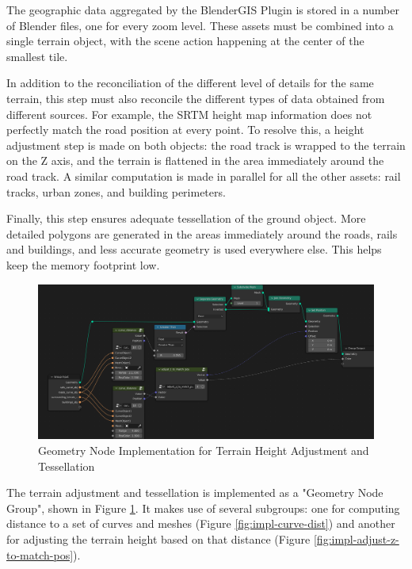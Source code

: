 The geographic data aggregated by the BlenderGIS Plugin is stored in a number of Blender files, one for every zoom level. These assets must be combined into a single terrain object, with the scene action happening at the center of the smallest tile.

In addition to the reconciliation of the different level of details for the same terrain, this step must also reconcile the different types of data obtained from different sources. For example, the SRTM height map information does not perfectly match the road position at every point. To resolve this, a height adjustment step is made on both objects: the road track is wrapped to the terrain on the Z axis, and the terrain is flattened in the area immediately around the road track. A similar computation is made in parallel for all the other assets: rail tracks, urban zones, and building perimeters.

Finally, this step ensures adequate tessellation of the ground object. More detailed polygons are generated in the areas immediately around the roads, rails and buildings, and less accurate geometry is used everywhere else. This helps keep the memory footprint low.

\begin{figure}[H]
    \centering
    \includegraphics[width=14.5cm]{src/img/pic/pic-2 screenshot of blender adjust terrain geometry node.jpg}
    \caption{Geometry Node Implementation for Terrain Height Adjustment and Tessellation}
    \label{fig:impl-geom-nodes-terrain}
\end{figure}


The terrain adjustment and tessellation is implemented as a "Geometry Node Group", shown in Figure \ref{fig:impl-geom-nodes-terrain}. It makes use of several subgroups: one for computing distance to a set of curves and meshes (Figure \ref{fig:impl-curve-dist}) and another for adjusting the terrain height based on that distance (Figure \ref{fig:impl-adjust-z-to-match-pos}).


